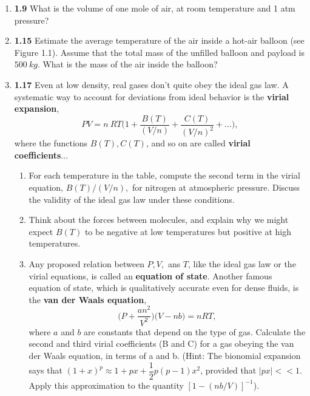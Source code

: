 \documentclass[fleqn]{article}
\begin{document}
  \begin{enumerate}
    \item \textbf{1.9} What is the volume of one mole of air, at room temperature and 1 atm pressure?
    

    \item \textbf{1.15} Estimate the average temperature of the air inside a hot-air balloon (see Figure 1.1). Assume 
    that the total mass of the unfilled balloon and payload is $500 ~ kg$. What is the mass of the air inside the balloon?

    
    \item \textbf{1.17} Even at low density, real gases don't quite obey the ideal gas law. A systematic way to account for deviations 
    from ideal behavior is the \textbf{virial expansion},
    $$
      PV=n ~ RT \bigg(1+\dfrac{B(T)}{(V/n)}+\dfrac{C(T)}{(V/n)^2}+...\bigg),
    $$
    where the functions $B(T), C(T)$, and so on are called \textbf{virial coefficients}... 
    \begin{enumerate}
      \item For each temperature in the table, compute the second term in the virial equation, $B(T)/(V/n),$ for nitrogen at atmospheric
      pressure. Discuss the validity of the ideal gas law under these conditions.


      \item Think about the forces between molecules, and explain why we might expect $B(T)$ to be negative at low temperatures but positive 
      at high temperatures.


      \item Any proposed relation between $P, V,$ ans $T$, like the ideal gas law or the virial equations, is called an \textbf{equation of state}.
      Another famous equation of state, which is qualitatively accurate even for dense fluids, is the \textbf{van der Waals equation},
      $$
        \bigg(P+\dfrac{an^2}{V^2}\bigg) \bigg(V-nb\bigg)=nRT,
      $$
      where $a$ and $b$ are constants that depend on the type of gas. Calculate the second and third virial coefficients (B and C) for a gas
      obeying the van der Waals equation, in terms of a and b. (Hint: The bionomial expansion says that 
      $(1+x)^p \approx 1+px+\dfrac{1}{2} p(p-1) x^2$, provided that $|px|<<1$. Apply this approximation to the quantity 
      $\left[1-(nb/V)\right]^{-1}$).


\end{enumerate}
\end{enumerate}
\end{document}
